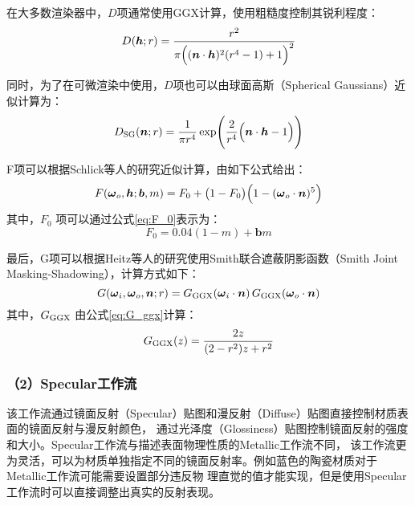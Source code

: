 在大多数渲染器中，$D$项通常使用GGX\cite{walter2007microfacet}计算，使用粗糙度控制其锐利程度：
\begin{equation}\label{eq:D_ggx}
D({\boldsymbol{h}};r)=\frac{r^2}{\pi\Bigl(({\boldsymbol{n}}\cdot{\boldsymbol{h}})^2(r^4-1)+1\Bigr)^2}
\end{equation}

同时，为了在可微渲染中使用，$D$项也可以由球面高斯（Spherical Gaussians）近似计算为：
\begin{equation}\label{eq:Dsg}
D_{\rm{SG}}({\boldsymbol{n}};r)=\frac{1}{\pi r^4}\exp\Biggl(\frac{2}{r^4}\Bigl({\boldsymbol{n}}\cdot{\boldsymbol{h}}-1\Bigr)\Biggr)
\end{equation}

F项可以根据Schlick等人\cite{schlick1994inexpensive}的研究近似计算，由如下公式给出：
\begin{equation}
  \label{eq:F}
  F({\boldsymbol{\omega}}_o,{\boldsymbol{h}};{\boldsymbol{b}},m)=F_0+\bigl(1-F_0\bigr)\Bigl(1-({\boldsymbol{\omega}}_o\cdot{\boldsymbol{n}})^5\Bigr)
\end{equation}
其中，$F_0$ 项可以通过公式\eqref{eq:F_0}表示为：
\begin{equation}
  \label{eq:F_0}
  F_0=0.04(1-m)+{\boldsymbol{b}}m
\end{equation}

最后，G项可以根据Heitz等人\cite{heitz2014understanding}的研究使用Smith联合遮蔽阴影函数（Smith Joint Masking-Shadowing），计算方式如下：
\begin{equation}
  \label{eq:G}
  G({\boldsymbol{\omega}}_i,{\boldsymbol{\omega}}_o,{\boldsymbol{n}};r)=G_{\rm{GGX}}({\boldsymbol{\omega}}_i\cdot{\boldsymbol{n}})\,G_{\rm{GGX}}({\boldsymbol{\omega}}_o\cdot{\boldsymbol{n}})
\end{equation}
其中，$G_{\rm{GGX}}$ 由公式\eqref{eq:G_ggx}计算：
\begin{equation}
  \label{eq:G_ggx}
  G_{\rm{GGX}}(z)=\frac{2z}{(2-r^2)z+r^2}
\end{equation}

\subsubsection*{（2）Specular工作流}

该工作流通过镜面反射（Specular）贴图和漫反射（Diffuse）贴图直接控制材质表面的镜面反射与漫反射颜色，
通过光泽度（Glossiness）贴图控制镜面反射的强度和大小。Specular工作流与描述表面物理性质的Metallic工作流不同，
该工作流更为灵活，可以为材质单独指定不同的镜面反射率。例如蓝色的陶瓷材质对于Metallic工作流可能需要设置部分违反物
理直觉的值才能实现，但是使用Specular工作流时可以直接调整出真实的反射表现。

